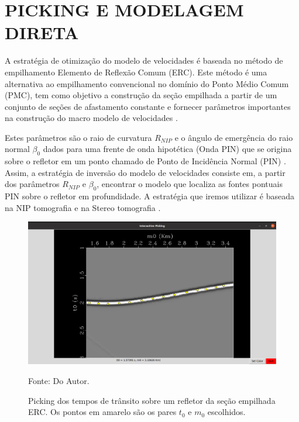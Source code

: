 \chapter{PICKING E MODELAGEM DIRETA}
\label{cap2}

A estratégia de otimização do modelo de velocidades é baseada no método de empilhamento Elemento de Reflexão Comum (ERC).
Este método é uma alternativa ao empilhamento convencional no domínio do Ponto Médio Comum (PMC), tem como
objetivo a construção da seção empilhada a partir de um conjunto de seções de afastamento constante e
fornecer parâmetros importantes na construção do macro modelo de velocidades \cite{cre}.

Estes parâmetros são o raio de curvatura $R_{NIP}$ e o ângulo de emergência do raio normal $\beta_0$ dados para
uma frente de onda hipotética (Onda PIN) que se origina sobre o refletor em um ponto chamado de Ponto de Incidência Normal
(PIN) \cite{hubral}. Assim, a estratégia de inversão do modelo de velocidades consiste em, a partir dos parâmetros $R_{NIP}$
e $\beta_0$, encontrar o modelo que localiza as fontes pontuais PIN sobre o refletor em profundidade.
A estratégia que iremos utilizar é baseada na NIP tomografia \cite{niptomo} e na Stereo tomografia \cite{stereo}.

\begin{figure}[H]
\caption{Picking dos tempos de trânsito sobre um refletor da seção empilhada ERC. Os pontos
em amarelo são os pares $t_0$ e $m_0$ escolhidos.}
\begin{center}
\includegraphics[scale=0.3]{images/picking.png}
\vspace{-0.3cm}
\end{center}
\begin{center}
 Fonte: Do Autor.
\end{center}
\label{fig:2.1}
\end{figure}

